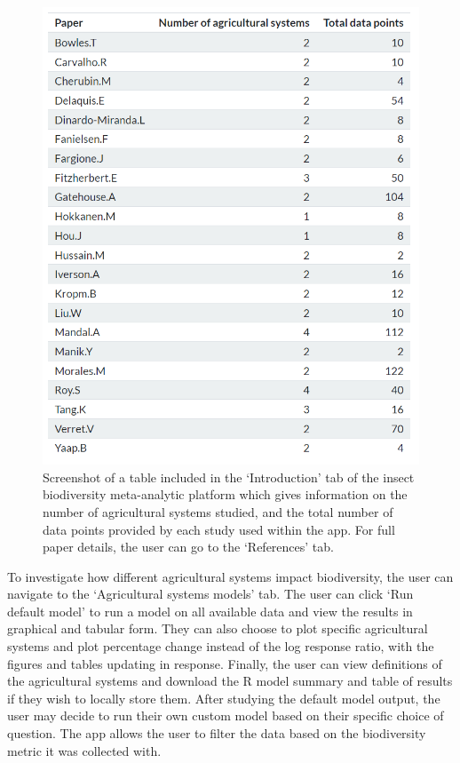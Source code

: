 \documentclass[11pt]{article}
\begin{document}
			\begin{figure}[H] 
				\centering 
				\includegraphics[scale=0.75]{figure_2_paper_details_table.png} 
				\caption{Screenshot of a table included in the ‘Introduction’ tab of the insect biodiversity meta-analytic platform which gives information on the number of agricultural systems studied, and the total number of data points provided by each study used within the app. For full paper details, the user can go to the ‘References’ tab.}  
			\end{figure}
			
			\noindent To investigate how different agricultural systems impact biodiversity, the user can navigate to the ‘Agricultural systems models’ tab. The user can click ‘Run default model’ to run a model on all available data and view the results in graphical and tabular form. They can also choose to plot specific agricultural systems and plot percentage change instead of the log response ratio, with the figures and tables updating in response. Finally, the user can view definitions of the agricultural systems and download the R model summary and table of results if they wish to locally store them. After studying the default model output, the user may decide to run their own custom model based on their specific choice of question. The app allows the user to filter the data based on the biodiversity metric it was collected with. 
			
\end{document}
